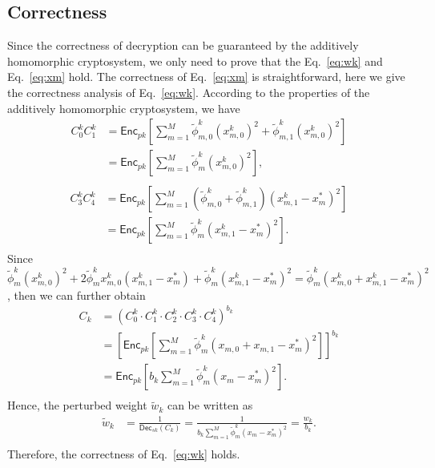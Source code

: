 \documentclass[conference]{IEEEtran}
\begin{document}
\subsection{Correctness}
Since the correctness of decryption can be guaranteed by the additively homomorphic cryptosystem, we only need to prove that the Eq.~\ref{eq:wk} and Eq.~\ref{eq:xm} hold.
The correctness of Eq.~\ref{eq:xm} is straightforward, here we give the correctness analysis of Eq.~\ref{eq:wk}.
According to the properties of the additively homomorphic cryptosystem, we have
\begin{equation*}
  \begin{split}
  C_0^k C_1^k & = \mathsf{Enc}_{pk}\left[\sum_{m=1}^M \tilde{\phi}_{m,0}^k\left(x_{m,0}^k\right)^2 + \tilde{\phi}_{m,1}^k\left(x_{m,0}^k\right)^2  \right] \\
   & = \mathsf{Enc}_{pk}\left[\sum_{m=1}^M \tilde{\phi}_m^k\left(x_{m,0}^k\right)^2 \right] , \\
  \end{split}
\end{equation*}
\begin{equation*}
  \begin{split}
  C_3^kC_4^k & = \mathsf{Enc}_{pk}\left[\sum_{m=1}^M \left(\tilde{\phi}_{m,0}^k + \tilde{\phi}_{m,1}^k\right) \left(x_{m,1}^k-x_m^*\right)^2 \right] \\
  & = \mathsf{Enc}_{pk}\left[\sum_{m=1}^M \tilde{\phi}_m^k\left(x_{m,1}^k - x_m^*\right)^2\right] . \\
  \end{split}
\end{equation*}
Since $\tilde{\phi}_m^k (x_{m,0}^k)^2 + 2\tilde{\phi}_m^kx_{m,0}^k\left(x_{m,1}^k - x_m^*\right) + \tilde{\phi}_m^k(x_{m,1}^k - x_m^*)^2 = \tilde{\phi}_m^k (x_{m,0}^k + x_{m,1}^k - x_m^*)^2$, then we can further obtain
\begin{equation*}
  \begin{split}
  C_k & = \left(C_0^k \cdot C_1^k\cdot C_2^k \cdot C_3^k \cdot C_4^k\right)^{b_k} \\
   & = \left[\mathsf{Enc}_{pk}\left[\sum_{m=1}^M \tilde{\phi}_m^k (x_{m,0} + x_{m,1} - x_m^*)^2 \right]\right]^{b_k} \\
  & = \mathsf{Enc}_{pk}\left[b_k \sum_{m=1}^M \tilde{\phi}_m^k (x_m - x_m^*)^2 \right] . \\
  \end{split}
\end{equation*}
Hence, the perturbed weight $\tilde{w}_k$ can be written as
\begin{equation*}
  \begin{split}
  \tilde{w}_k & = \frac{1}{\mathsf{Dec}_{sk}\left(C_k\right)} = \frac{1}{b_k \sum\limits_{m=1}^M \tilde{\phi}_m^k (x_m - x_m^*)^2} = \frac{w_k}{b_k} . \\
  \end{split}
\end{equation*}
Therefore, the correctness of Eq.~\ref{eq:wk} holds.
\end{document}
